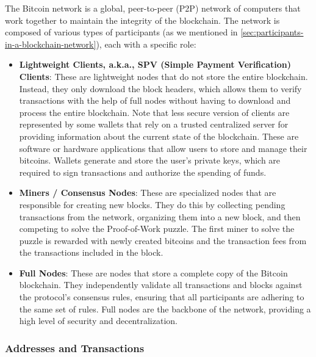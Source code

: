 The Bitcoin network is a global, peer-to-peer (P2P) network of computers
that work together to maintain the integrity of the blockchain. The
network is composed of various types of participants (as we mentioned in \autoref{sec:participants-in-a-blockchain-network}), each with a
specific role:

\begin{itemize}
	\tightlist
	\item
	\textbf{Lightweight Clients, a.k.a., SPV (Simple Payment Verification) Clients}: These are
	lightweight nodes that do not store the entire blockchain. Instead,
	they only download the block headers, which allows them to verify
	transactions with the help of full nodes without having to download
	and process the entire blockchain.
	Note that less secure version of clients are represented by some wallets that rely on a trusted centralized server for providing information about the current state of the blockchain. 
	These are software or hardware
	applications that allow users to store and manage their bitcoins.
	Wallets generate and store the user's private keys, which are required
	to sign transactions and authorize the spending of funds.
	\item
	\textbf{Miners / Consensus Nodes}: These are specialized nodes that are responsible for
	creating new blocks. They do this by collecting pending transactions
	from the network, organizing them into a new block, and then competing
	to solve the Proof-of-Work puzzle. The first miner to solve the puzzle
	is rewarded with newly created bitcoins and the transaction fees from
	the transactions included in the block.
	\item
	\textbf{Full Nodes}: These are nodes that store a complete copy of the
	Bitcoin blockchain. They independently validate all transactions and
	blocks against the protocol's consensus rules, ensuring that all
	participants are adhering to the same set of rules. Full nodes are the
	backbone of the network, providing a high level of security and
	decentralization.


\end{itemize}

\subsubsection{Addresses and
	Transactions}\label{addresses-and-transactions}

